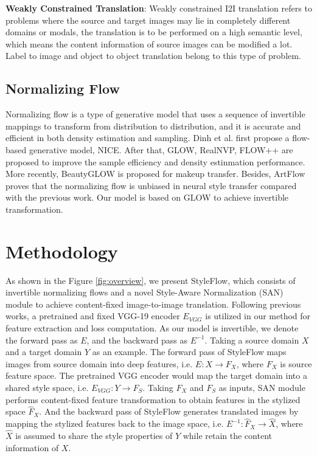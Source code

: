 \documentclass[runningheads]{llncs}
\begin{document}
\noindent\textbf{Weakly Constrained Translation}: Weakly constrained I2I translation refers to problems where the source and target images may lie in completely different domains or modals, the translation is to be performed on a high semantic level, which means the content information of source images can be modified a lot. Label to image\cite{lin2018conditional,isola2017image} and object to object translation\cite{huang2018multimodal,lee2018diverse,liu2017unsupervised,zhu2017unpaired,park2020contrastive} belong to this type of problem.

\subsection{Normalizing Flow}
Normalizing flow is a type of  generative model that uses a sequence of invertible mappings to transform from distribution to distribution, and it is accurate and efficient in both density estimation and sampling\cite{kobyzev2020normalizing}. Dinh et al.\cite{dinh2014nice} first propose a flow-based generative model, NICE. After that, GLOW\cite{kingma2018glow}, RealNVP\cite{dinh2016density}, FLOW++\cite{ho2019flow++} are proposed to improve the sample efficiency and density estinmation performance. More recently, BeautyGLOW\cite{chen2019beautyglow} is proposed for makeup transfer. Besides, ArtFlow\cite{an2021artflow} proves that the normalizing flow is unbiased in neural style transfer compared with the previous work. Our model is based on GLOW\cite{kingma2018glow} to achieve invertible transformation. 
\section{Methodology}
As shown in the Figure \ref{fig:overview}, we present StyleFlow, which consists of invertible normalizing flows and a novel Style-Aware Normalization (SAN) module to achieve content-fixed image-to-image translation. Following previous works, a pretrained and fixed VGG-19 encoder $E_{VGG}$ is utilized in our method for feature extraction and loss computation. As our model is invertible, we denote the forward pass as $E$, and the backward pass as $E^{-1}$. Taking a source domain $X$ and a target domain $Y$ as an example. The forward pass of StyleFlow maps images from source domain into deep features, i.e. $E: X\rightarrow {F_X}$, where $F_X$ is source feature space. The pretrained VGG encoder would map the target domain into a shared style space, i.e. $E_{VGG}: Y\rightarrow F_S$. Taking $F_X$ and $F_S$ as inputs, SAN module performs content-fixed feature transformation to obtain features in the stylized space $\hat{F}_X$. And the backward pass of StyleFlow generates translated images by mapping the stylized features back to the image space, i.e. $E^{-1}: \hat{F}_X \rightarrow \hat{X}$, where $\hat{X}$ is assumed to share the style properties of $Y$ while retain the content information of $X$.
\end{document}
